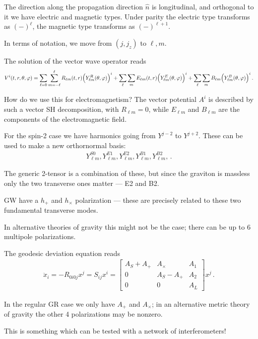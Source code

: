 \documentclass[main.tex]{subfiles}
\begin{document}
The direction along the propagation direction \(\hat{n}\) is longitudinal, and orthogonal to it we have electric and magnetic types. 
Under parity the electric type transforms as \((-)^{\ell}\), the magnetic type transforms as \((-)^{\ell +1}\).

In terms of notation, we move from \((j, j_z)\) to \(\ell, m\). 

The solution of the vector wave operator reads 
%
\begin{align}
V^{i} (t, r, \theta , \varphi ) = \sum _{\ell = 0} \sum _{m=- \ell}^{\ell} R_{\ell m}(t, r) \qty(Y^{R}_{\ell m} (\theta , \varphi ))^{i}
+ \sum _{\ell} \sum _{m} E_{\ell m}(t, r) \qty(Y^{E}_{\ell m}(\theta , \varphi ))^{i} +  
\sum _{\ell} \sum _{m} B_{\ell m} \qty(Y^{B}_{\ell m}(\theta , \varphi ))^{i} 
\,.
\end{align}

How do we use this for electromagnetism?
The vector potential \(A^{i}\) is described by such a vector SH decomposition, with \(R_{\ell m} = 0\), while  \(E_{\ell m}\) and \(B_{\ell m}\) are the components of the electromagnetic field. 

For the spin-2 case we have harmonics going from \(Y^{j-2}\) to \(Y^{j + 2}\). 
These can be used to make a new orthornormal basis: 
%
\begin{align}
Y^{S0}_{\ell m}, 
Y^{E1}_{\ell m}, 
Y^{E2}_{\ell m}, 
Y^{B1}_{\ell m}, 
Y^{B2}_{\ell m}, 
\,.
\end{align}

The generic 2-tensor is a combination of these, but since the graviton is massless only the two transverse ones matter --- E2 and B2. 

GW have a \(h_+\) and \(h_\times \) polarization --- these are precisely related to these two fundamental transverse modes. 

In alternative theories of gravity this might not be the case; there can be up to 6 multipole polarizations. 

The geodesic deviation equation reads 
%
\begin{align}
\ddot{x}_{i} = - R_{0i0j}x^{j} =  S_{ij} x^{i} =
\left[\begin{array}{ccc}
A_S + A_+ & A_\times  & A_1 \\ 
0 & A_S - A_+ & A_2 \\ 
0 & 0 & A_L
\end{array}\right] x^{j}
\,.
\end{align}

In the regular GR case we only have \(A_+\) and \(A_\times \); in an alternative metric theory of gravity the other 4 polarizations may be nonzero. 

This is something which can be tested with a network of interferometers! 
\end{document}
